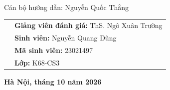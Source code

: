 \begin{titlepage}
\vspace{0.75cm}
\begin{center}
{\fontsize{12}{16}\selectfont Cán bộ hướng dẫn: \color{coveraccent}Nguyễn Quốc Thắng\par}
\end{center}

\vfill
\begin{tabularx}{0.82\textwidth}{@{}X X@{}}
&
{\fontsize{12}{16}\selectfont \textbf{Giảng viên đánh giá:} \color{coveraccent}ThS. Ngô Xuân Trường}\\[0.12cm]
&
{\fontsize{12}{16}\selectfont \textbf{Sinh viên:} \color{coveraccent}Nguyễn Quang Dũng}\\[-0.02cm]
&
{\fontsize{12}{16}\selectfont \textbf{Mã sinh viên:} \color{coveraccent}23021497}\\[-0.02cm]
&
{\fontsize{12}{16}\selectfont \textbf{Lớp:} \color{coveraccent}K68-CS3}
\end{tabularx}

\vfill
\begin{center}
{\fontsize{16}{20}\selectfont\bfseries Hà Nội, \color{coveraccent}tháng 10 năm 2026}
\end{center}
\vspace*{0.5cm}
\end{titlepage}
\nopagecolor
\color{black}
\clearpage
